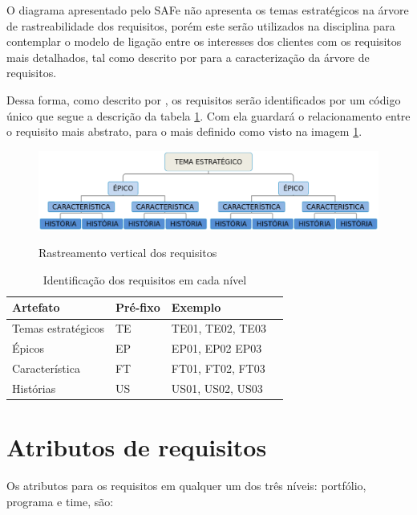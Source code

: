 O diagrama apresentado pelo SAFe não apresenta os temas estratégicos na árvore de rastreabilidade dos requisitos, porém este serão utilizados na disciplina para contemplar o modelo de ligação entre os interesses dos clientes com os requisitos mais detalhados, tal como descrito por \cite{leffingwell2011} para a caracterização da árvore de requisitos.

Dessa forma, como descrito por \cite{silva2011}, os requisitos serão identificados por um código único que segue a descrição da tabela \ref{identificadores}. Com ela guardará o relacionamento entre o requisito mais abstrato, para o mais definido como visto na imagem \ref{rastreabilidade}.
\begin{figure}[H]
    \centering
    \caption{Rastreamento vertical dos requisitos}
    \includegraphics[keepaspectratio=true,scale=0.4]{figuras/rastreabilidade.eps}
    \label{rastreabilidade}
\end{figure}
\begin{table}[h]
    \centering
    \caption{Identificação dos requisitos em cada nível}
    \label{identificadores}
    \begin{tabular}{l|l|l|l}
        Artefato & Pré-fixo & Exemplo \\
        \hline    
        Temas estratégicos & TE & TE01, TE02, TE03 \\
        Épicos & EP & EP01, EP02 EP03 \\
        Característica & FT & FT01, FT02, FT03 \\
        Histórias & US & US01, US02, US03 \\
    \end{tabular}
\end{table}

\section{Atributos de requisitos}

Os atributos para os requisitos em qualquer um dos três níveis: portfólio, programa e time, são: 

